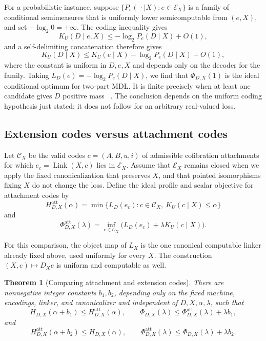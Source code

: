 \documentclass[11pt]{article}
\newtheorem{theorem}{Theorem}[section]
\newcommand{\K}{K_U}
\begin{document}
For a probabilistic instance, suppose
\(\{P_e(\,\cdot\mid X):e\in\mathcal E_X\}\) is a family of conditional
semimeasures that is uniformly lower semicomputable from \((e,X)\), and set
\(-\log_2 0=+\infty\).  The coding inequality gives
\[
 \K(D\mid e,X)
 \le-\log_2 P_e(D\mid X)+O(1),
\]
and a self-delimiting concatenation therefore gives
\[
 \K(D\mid X)
 \le \K(e\mid X)-\log_2 P_e(D\mid X)+O(1),
\]
where the constant is uniform in \(D,e,X\) and depends only on the decoder for
the family.  Taking \(L_D(e)=-\log_2P_e(D\mid X)\), we find that
\(\Phi_{D,X}(1)\) is the ideal conditional optimum for two-part MDL.  It is
finite precisely when at least one candidate gives \(D\) positive mass
~\cite{rissanen,livitanyi}.  The conclusion depends on the uniform coding
hypothesis just stated; it does not follow for an arbitrary real-valued loss.

\subsection{Extension codes versus attachment codes}

Let \(\mathcal C_X\) be the valid codes \(c=(A,B,u,i)\) of admissible
cofibration attachments for which \(e_c=\operatorname{Link}(X,c)\) lies in
\(\mathcal E_X\).  Assume that \(\mathcal E_X\) remains closed when we apply
the fixed canonicalization that preserves \(X\), and that pointed isomorphisms
fixing \(X\) do not change the loss.  Define the ideal profile and scalar
objective for attachment codes by
\[
 H^{\mathrm{att}}_{D,X}(\alpha)
 =\min\{L_D(e_c):c\in\mathcal C_X,\ \K(c\mid X)\le\alpha\}
\]
and
\[
 \Phi^{\mathrm{att}}_{D,X}(\lambda)
 =\inf_{c\in\mathcal C_X}
   \bigl(L_D(e_c)+\lambda\K(c\mid X)\bigr).
\]

For this comparison, the object map of \(L_X\) is the one canonical computable
linker already fixed above, used uniformly for every \(X\).  The construction
\((X,e)\mapsto D_Xe\) is uniform and computable as well.

\begin{theorem}[Comparing attachment and extension codes]\label{thm:attachment-profile}
There are nonnegative integer constants \(b_1,b_2\), depending only on the
fixed machine, encodings, linker, and canonicalizer and independent of
\(D,X,\alpha,\lambda\), such that
\[
 H_{D,X}(\alpha+b_1)
 \le H^{\mathrm{att}}_{D,X}(\alpha),
 \qquad
 \Phi_{D,X}(\lambda)
 \le\Phi^{\mathrm{att}}_{D,X}(\lambda)+\lambda b_1,
\]
and
\[
 H^{\mathrm{att}}_{D,X}(\alpha+b_2)
 \le H_{D,X}(\alpha),
 \qquad
 \Phi^{\mathrm{att}}_{D,X}(\lambda)
 \le\Phi_{D,X}(\lambda)+\lambda b_2.
\]
\end{theorem}
\end{document}
